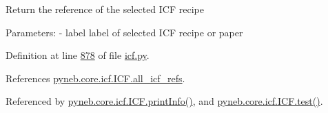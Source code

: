 \begin{DoxyVerb}Return the reference of the selected ICF recipe 

Parameters:
    - label    label of selected ICF recipe or paper\end{DoxyVerb}
 

Definition at line \hyperlink{icf_8py_source_l00878}{878} of file \hyperlink{icf_8py_source}{icf.\-py}.



References \hyperlink{icf_8py_source_l00680}{pyneb.\-core.\-icf.\-I\-C\-F.\-all\-\_\-icf\-\_\-refs}.



Referenced by \hyperlink{icf_8py_source_l00853}{pyneb.\-core.\-icf.\-I\-C\-F.\-print\-Info()}, and \hyperlink{icf_8py_source_l01114}{pyneb.\-core.\-icf.\-I\-C\-F.\-test()}.


